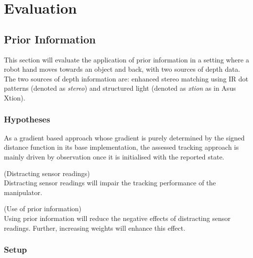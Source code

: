\chapter{Evaluation}

\section{Prior Information}

This section will evaluate the application of prior information in a setting where a robot hand moves towards an object and back, with two sources of depth data. The two sources of depth information are: enhanced stereo matching using IR dot patterns (denoted as \emph{stereo}) and structured light (denoted as \emph{xtion} as in Asus Xtion).

\subsection{Hypotheses}

As a gradient based approach whose gradient is purely determined by the signed distance function in its base implementation, the assessed tracking approach is mainly driven by observation once it is initialised with the reported state.


\begin{hypothesis}(Distracting sensor readings)\\
Distracting sensor readings will impair the tracking performance of the manipulator.
\end{hypothesis}

\begin{hypothesis}(Use of prior information)\\
Using prior information will reduce the negative effects of distracting sensor readings. Further, increasing weights will enhance this effect.
\end{hypothesis}


\subsection{Setup}

